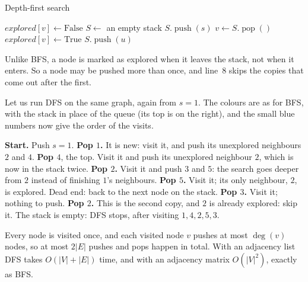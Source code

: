 \documentclass[a4paper,12pt,oneside]{report}
\begin{document}
\begin{framedalgo}{Depth-first search}\label{alg:dfs}
\begin{algorithmic}[1]
      \State $\mathit{explored}[v]\gets\mathrm{False}$
    \EndFor
    \State $S\gets$ an empty stack
    \State $S.\operatorname{push}(s)$
      \State $v\gets S.\operatorname{pop}()$
        \State $\mathit{explored}[v]\gets\mathrm{True}$
            \State $S.\operatorname{push}(u)$
          \EndIf
        \EndFor
      \EndIf
    \EndWhile
  \EndFunction
\end{algorithmic}
\end{framedalgo}

Unlike BFS, a node is marked as explored when it leaves the stack,
not when it enters. So a node may be pushed more than once, and
line~8 skips the copies that come out after the first.

Let us run DFS on the same graph, again from $s=1$. The colours are
as for BFS, with the stack in place of the queue (its top is on the
right), and the small blue numbers now give the order of the visits.

\medskip
{}
  {\textbf{Start.} Push $s=1$.}
  {\textbf{Pop $1$.} It is new: visit it, and push its unexplored
   neighbours $2$ and $4$.}
  {\textbf{Pop $4$}, the top. Visit it and push its unexplored
   neighbour $2$, which is now in the stack twice.}
  {\textbf{Pop $2$.} Visit it and push $3$ and $5$: the search goes
   deeper from $2$ instead of finishing $1$'s neighbours.}
  {\textbf{Pop $5$.} Visit it; its only neighbour, $2$, is explored.
   Dead end: back to the next node on the stack.}
  {\textbf{Pop $3$.} Visit it; nothing to push.}
  {\textbf{Pop $2$.} This is the second copy, and $2$ is already
   explored: skip it. The stack is empty: DFS stops, after visiting
   $1,4,2,5,3$.}

Every node is visited once, and each visited node $v$ pushes at most
$\deg(v)$ nodes, so at most $2|E|$ pushes and pops happen in total.
With an adjacency list DFS takes $O(|V|+|E|)$ time, and with an
adjacency matrix $O(|V|^2)$, exactly as BFS.
\end{document}
